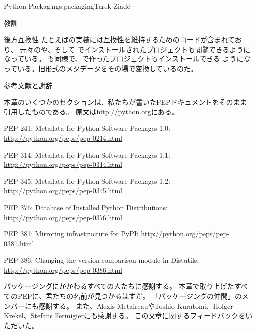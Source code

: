 \begin{aosachapter}{Python Packaging}{s:packaging}{Tarek Ziad\'{e}}
\begin{aosasect1}{教訓}
\begin{aosasect2}{後方互換性}
たとえばの実装には互換性を維持するためのコードが含まれており、
元々のや、そして
でインストールされたプロジェクトも閲覧できるようになっている。
も同様で、で作ったプロジェクトもインストールできる
ようになっている。旧形式のメタデータをその場で変換しているのだ。

\end{aosasect2}


\end{aosasect1}

\begin{aosasect1}{参考文献と謝辞}

本章のいくつかのセクションは、私たちが書いたPEPドキュメントをそのまま引用したものである。
原文は\url{http://python.org}にある。

\begin{aosaitemize}
  \item PEP 241: Metadata for Python Software Packages 1.0: \url{http://python.org/peps/pep-0214.html}
  \item PEP 314: Metadata for Python Software Packages 1.1: \url{http://python.org/peps/pep-0314.html}
  \item PEP 345: Metadata for Python Software Packages 1.2: \url{http://python.org/peps/pep-0345.html}
  \item PEP 376: Database of Installed Python Distributions: \url{http://python.org/peps/pep-0376.html}
  \item PEP 381: Mirroring infrastructure for PyPI: \url{http://python.org/peps/pep-0381.html}
  \item PEP 386: Changing the version comparison module in Distutils: \url{http://python.org/peps/pep-0386.html}
\end{aosaitemize}

パッケージングにかかわるすべての人たちに感謝する。
本章で取り上げたすべてのPEPに、君たちの名前が見つかるはずだ。
「パッケージングの仲間」のメンバーにも感謝する。
また、Alexis MetaireauやToshio Kuratomi、Holger Krekel、Stefane Fermigierにも感謝する。
この文章に関するフィードバックをいただいた。


\end{aosasect1}
\end{aosachapter}
